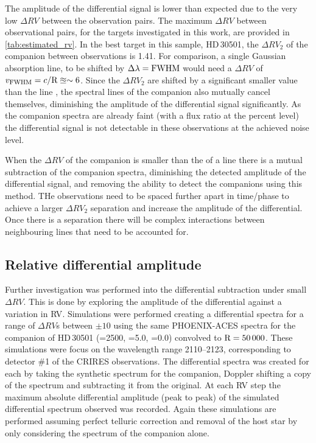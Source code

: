 The amplitude of the differential signal is lower than expected due to the very low \(\Delta {RV}\) between the observation pairs.
The maximum \(\Delta {RV}\) between observational pairs, for the targets investigated in this work, are provided in \cref{tab:estimated_rv}.
In the best target in this sample, {HD\,30501}, the \(\Delta {RV}_2\) of the companion between observations is 1.41\kmps{}.
For comparison, a single Gaussian absorption line, to be shifted by \(\Delta\lambda = {\textrm{FWHM}}\) would need a \(\Delta {RV}\) of \(v_{\textrm{FWHM}} = c/\textrm{R} \approxeq\sim6\)\kmps{}.
Since the \(\Delta {RV}_2\) are shifted by a significant smaller value than the line {\fwhm}, the spectral lines of the companion also mutually cancel themselves, diminishing the amplitude of the differential signal significantly.
As the companion spectra are already faint (with a flux ratio at the percent level) the differential signal is not detectable in these observations at the achieved noise level.

When the \(\Delta {RV}\) of the companion is smaller than the {\fwhm} of a line there is a mutual subtraction of the companion spectra, diminishing the detected amplitude of the differential signal, and removing the ability to detect the companions using this method.
THe observations need to be spaced further apart in time/phase to achieve a larger \(\Delta {RV}_2\) separation and increase the amplitude of the differential.
Once there is a separation there will be complex interactions between neighbouring lines that need to be accounted for.


\subsection{Relative differential amplitude}
\label{subsec:relative_differential_amplitue}
Further investigation was performed into the differential subtraction under small \(\Delta {RV}\).
This is done by exploring the amplitude of the differential against a variation in {RV}.
Simulations were performed creating a differential spectra for a range of \(\Delta {RV}\)s between \(\pm10\)\kmps{} using the same {PHOENIX-ACES} spectra for the companion of {HD\,30501} (\Teff{}=2500\K{}, \Logg{}=5.0, \feh{}=0.0) convolved to \(\textrm{R}=50\,000\).
These simulations were focus on the wavelength range 2110--2123\nm{}, corresponding to detector \#1 of the {CRIRES} observations.
The differential spectra was created for each by taking the synthetic spectrum for the companion, Doppler shifting a copy of the spectrum and subtracting it from the original.
At each {RV} step the maximum absolute differential amplitude (peak to peak) of the simulated differential spectrum observed was recorded.
Again these simulations are performed assuming perfect telluric correction and removal of the host star by only considering the spectrum of the companion alone.

